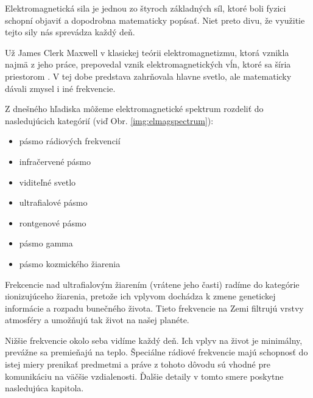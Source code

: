 
 \label{sec:elmag}

Elektromagnetická sila je jednou zo štyroch základných síl, ktoré boli fyzici schopní
objaviť a dopodrobna matematicky popísať. Niet preto divu, že využitie tejto sily nás
sprevádza každý deň.

Už James Clerk Maxwell v klasickej teórii elektromagnetizmu, ktorá vznikla najmä z jeho práce, 
prepovedal vznik elektromagnetických vĺn, ktoré sa šíria priestorom \cite{electromag}. V tej
dobe predstava zahrňovala hlavne svetlo, ale matematicky dávali zmysel i iné frekvencie.


Z dnešného hľadiska môžeme elektromagnetické spektrum rozdeliť do nasledujúcich kategórií (viď Obr. \ref{img:elmagspectrum}):
\begin{itemize}
\item pásmo rádiových frekvencií
\item infračervené pásmo
\item viditeľné svetlo
\item ultrafialové pásmo
\item rontgenové pásmo
\item pásmo gamma
\item pásmo kozmického žiarenia
\end{itemize}

Frekcencie nad ultrafialovým žiarením (vrátene jeho časti) radíme do kategórie \i{ionizujúceho} žiarenia, pretože ich vplyvom dochádza k zmene genetickej informácie a rozpadu bunečného života. Tieto frekvencie na Zemi filtrujú vrstvy atmosféry a umožňujú tak život na našej planéte.

Nižšie frekvencie okolo seba vidíme každý deň. Ich vplyv na život je minimálny, prevážne sa premieňajú na teplo. Špeciálne rádiové frekvencie majú schopnosť do istej miery prenikať predmetmi a práve z tohoto dôvodu sú vhodné pre komunikáciu na väčšie vzdialenosti. Ďalšie detaily v tomto smere poskytne nasledujúca kapitola.

 \label{sec:radio}


